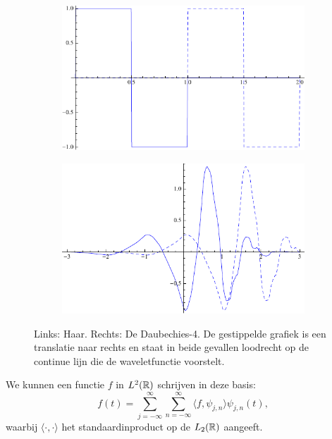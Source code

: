 \begin{figure}[h]
  \centering
  \begin{subfigure}{0.48\linewidth}
    \includegraphics[width=\linewidth]{plaatjes/db1.pdf}
  \end{subfigure}
  \begin{subfigure}{0.48\linewidth}
    \includegraphics[width=\linewidth]{plaatjes/db4.pdf}
  \end{subfigure}
  \caption{Links: Haar. Rechts: De Daubechies-4. De gestippelde grafiek is een translatie naar rechts en staat in beide gevallen loodrecht op de continue lijn die de waveletfunctie voorstelt.}
\label{fig:wavelets}
\end{figure}

\begin{gevolg}We kunnen een functie $f$ in $L^2(\mathbb{R})$ schrijven in deze basis:
  \[
  f(t) = \sum_{j=-\infty}^{\infty} \sum_{n=-\infty}^{\infty} \langle f, \psi_{j,n} \rangle \psi_{j,n}(t),
  \]
  waarbij $\langle \cdot, \cdot \rangle$ het standaardinproduct op de $L_2(\mathbb{R})$ aangeeft.
\end{gevolg}

